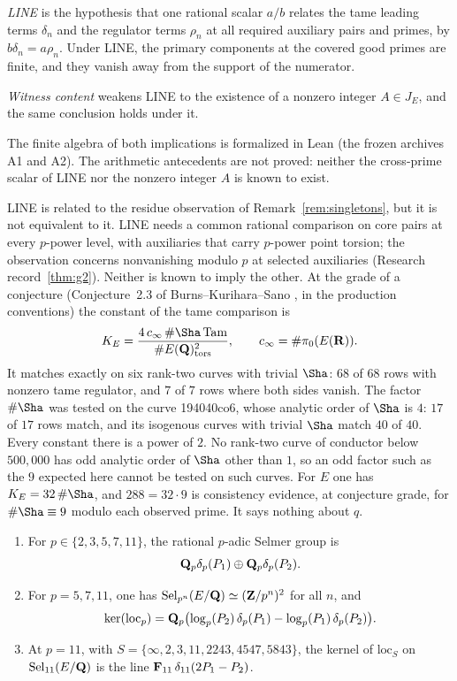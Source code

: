 \begin{researchrecord}\label{thm:line}
\emph{LINE} is the hypothesis that one rational scalar $a/b$ relates the tame leading terms $\delta_n$ and the regulator terms $\rho_n$ at all required auxiliary pairs and primes, by $b\delta_n=a\rho_n$. Under LINE, the primary components at the covered good primes are finite, and they vanish away from the support of the numerator.

\emph{Witness content} weakens LINE to the existence of a nonzero integer $A\in J_E$, and the same conclusion holds under it.
\end{researchrecord}
The finite algebra of both implications is formalized in Lean (the frozen archives A1 and A2). The arithmetic antecedents are not proved: neither the cross-prime scalar of LINE nor the nonzero integer $A$ is known to exist.

LINE is related to the residue observation of Remark~\ref{rem:singletons}, but it is not equivalent to it. LINE needs a common rational comparison on core pairs at every $p$-power level, with auxiliaries that carry $p$-power point torsion; the observation concerns nonvanishing modulo $p$ at selected auxiliaries (Research record~\ref{thm:g2}). Neither is known to imply the other. At the grade of a conjecture (Conjecture~2.3 of Burns--Kurihara--Sano \cite{bks}, in the production conventions) the constant of the tame comparison is
\[
K_E=\frac{4\,c_\infty\,\#\Sha\,\mathrm{Tam}}{\#E(\Q)_{\mathrm{tors}}^2},\qquad c_\infty=\#\pi_0(E(\mathbf{R})).
\]
It matches exactly on six rank-two curves with trivial $\Sha$: $68$ of $68$ rows with nonzero tame regulator, and $7$ of $7$ rows where both sides vanish. The factor $\#\Sha$ was tested on the curve 194040co6, whose analytic order of $\Sha$ is $4$: $17$ of $17$ rows match, and its isogenous curves with trivial $\Sha$ match $40$ of $40$. Every constant there is a power of $2$. No rank-two curve of conductor below $500{,}000$ has odd analytic order of $\Sha$ other than $1$, so an odd factor such as the $9$ expected here cannot be tested on such curves. For $E$ one has $K_E=32\,\#\Sha$, and $288=32\cdot9$ is consistency evidence, at conjecture grade, for $\#\Sha\equiv9$ modulo each observed prime. It says nothing about $q$.

\begin{proposition}\label{prop:localsel}
\begin{enumerate}[label=(\roman*)]
\item For $p\in\{2,3,5,7,11\}$, the rational $p$-adic Selmer group is\[\mathbf{Q}_p\delta_p(P_1)\oplus\mathbf{Q}_p\delta_p(P_2).\]
\item For $p=5,7,11$, one has $\operatorname{Sel}_{p^n}(E/\mathbf{Q})\simeq(\mathbf{Z}/p^n)^2$ for all $n$, and
\[
\ker(\mathrm{loc}_p)=\mathbf{Q}_p\bigl(\log_p(P_2)\,\delta_p(P_1)-\log_p(P_1)\,\delta_p(P_2)\bigr).
\]
\item At $p=11$, with $S=\{\infty,2,3,11,2243,4547,5843\}$, the kernel of $\mathrm{loc}_S$ on $\operatorname{Sel}_{11}(E/\mathbf{Q})$ is the line $\mathbf{F}_{11}\,\delta_{11}(2P_1-P_2)$.
\end{enumerate}
\end{proposition}

